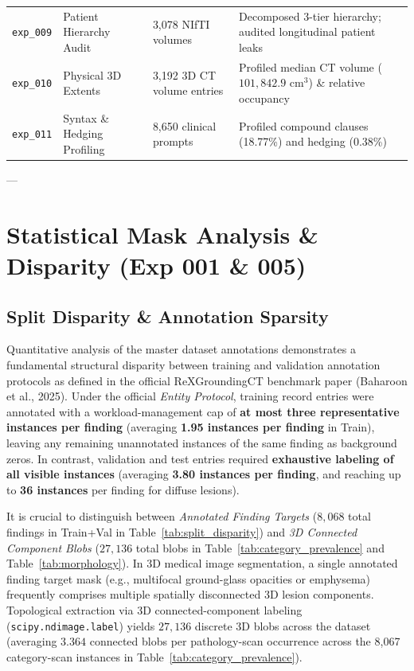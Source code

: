 \documentclass[11pt,a4paper]{article}
\begin{document}
\begin{table}[H]
{\begin{tabular}{clll}
\texttt{exp\_009} & Patient Hierarchy Audit & 3,078 NIfTI volumes & Decomposed 3-tier hierarchy; audited longitudinal patient leaks \\
\texttt{exp\_010} & Physical 3D Extents & 3,192 3D CT volume entries & Profiled median CT volume ($101,842.9\text{ cm}^3$) \& relative occupancy \\
\texttt{exp\_011} & Syntax \& Hedging Profiling & 8,650 clinical prompts & Profiled compound clauses (18.77\%) and hedging (0.38\%) \\
\bottomrule
\end{tabular}%
}
\end{table}

---

\section{Statistical Mask Analysis \& Disparity (Exp 001 \& 005)}

\subsection{Split Disparity \& Annotation Sparsity}
Quantitative analysis of the master dataset annotations demonstrates a fundamental structural disparity between training and validation annotation protocols as defined in the official ReXGroundingCT benchmark paper (Baharoon et al., 2025). Under the official \textit{Entity Protocol}, training record entries were annotated with a workload-management cap of \textbf{at most three representative instances per finding} (averaging \textbf{1.95 instances per finding} in Train), leaving any remaining unannotated instances of the same finding as background zeros. In contrast, validation and test entries required \textbf{exhaustive labeling of all visible instances} (averaging \textbf{3.80 instances per finding}, and reaching up to \textbf{36 instances} per finding for diffuse lesions).

It is crucial to distinguish between \textit{Annotated Finding Targets} ($8,068$ total findings in Train+Val in Table~\ref{tab:split_disparity}) and \textit{3D Connected Component Blobs} ($27,136$ total blobs in Table~\ref{tab:category_prevalence} and Table~\ref{tab:morphology}). In 3D medical image segmentation, a single annotated finding target mask (e.g., multifocal ground-glass opacities or emphysema) frequently comprises multiple spatially disconnected 3D lesion components. Topological extraction via 3D connected-component labeling (\texttt{scipy.ndimage.label}) yields $27,136$ discrete 3D blobs across the dataset (averaging $3.364$ connected blobs per pathology-scan occurrence across the 8,067 category-scan instances in Table~\ref{tab:category_prevalence}).
\end{document}
